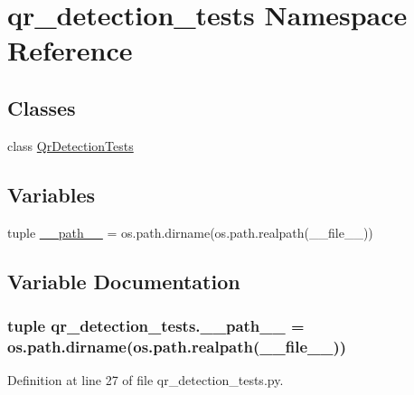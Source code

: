 \hypertarget{namespaceqr__detection__tests}{\section{qr\-\_\-detection\-\_\-tests Namespace Reference}
\label{namespaceqr__detection__tests}
}
\subsection*{Classes}
\begin{DoxyCompactItemize}
\item 
class \hyperlink{classqr__detection__tests_1_1QrDetectionTests}{Qr\-Detection\-Tests}
\end{DoxyCompactItemize}
\subsection*{Variables}
\begin{DoxyCompactItemize}
\item 
tuple \hyperlink{namespaceqr__detection__tests_a0a3d8a9e3eeb0f8ed94f5ff1111ed5ef}{\-\_\-\-\_\-path\-\_\-\-\_\-} = os.\-path.\-dirname(os.\-path.\-realpath(\-\_\-\-\_\-file\-\_\-\-\_\-))
\end{DoxyCompactItemize}


\subsection{Variable Documentation}
\hypertarget{namespaceqr__detection__tests_a0a3d8a9e3eeb0f8ed94f5ff1111ed5ef}{
\subsubsection[{\-\_\-\-\_\-path\-\_\-\-\_\-}]{\setlength{\rightskip}{0pt plus 5cm}tuple qr\-\_\-detection\-\_\-tests.\-\_\-\-\_\-path\-\_\-\-\_\- = os.\-path.\-dirname(os.\-path.\-realpath(\-\_\-\-\_\-file\-\_\-\-\_\-))}}\label{namespaceqr__detection__tests_a0a3d8a9e3eeb0f8ed94f5ff1111ed5ef}


Definition at line 27 of file qr\-\_\-detection\-\_\-tests.\-py.

